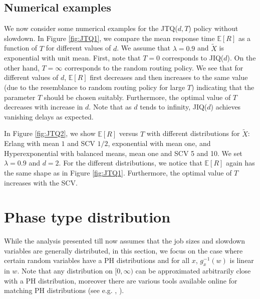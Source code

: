 \documentclass[12pt]{report}
\newcommand{\E}{\mathbb{E}}
\begin{document}
\subsection*{Numerical examples}
We now consider some numerical examples for the JTQ($d,T$) policy without slowdown. 
In Figure \ref{fig:JTQ1}, we compare the mean response time $\E[R]$ as a function of $T$ for different values of $d$. We assume that $\lambda  = 0.9$ and $\tilde X$ is exponential with unit mean. First, note that $T=0$ corresponds to JIQ($d$). On the other hand, $T= \infty$ corresponds to the random routing policy. We see that for different values of $d$, $\E[R]$ first decreases and then increases to the same value (due to the resemblance to random routing policy for large $T$) indicating that the parameter $T$ should be chosen suitably. Furthermore, the optimal value of $T$ decreases with increase in $d$. Note that as $d$ tends to infinity, JIQ($d$) achieves vanishing delays as expected.

In Figure \ref{fig:JTQ2}, we show $\E[R]$ versus $T$ with different distributions for $\tilde{X}$: Erlang with mean $1$ and SCV $1/2$, exponential with mean one, and Hyperexponential with balanced means, mean one and SCV 5 and 10. We set $\lambda = 0.9$ and $d=2$. For the different distributions, we notice that $\E[R]$ again has the same shape as in Figure \ref{fig:JTQ1}. Furthermore, the optimal value of $T$ increases with the SCV.

\section{Phase type distribution}\label{sec:PH_dist}
While the analysis presented till now assumes that the job sizes and slowdown variables are generally distributed, in this section, we focus on the case where certain random variables have a PH distributions and for all $x$, $g_x^{-1}(w)$ is linear in $w$. Note that any distribution on $[0,\infty)$ can be approximated arbitrarily close with a PH distribution, moreover there are various tools available online for matching PH distributions (see e.g. \cite{Kriege2014}, \cite{panchenko1}).
\end{document}
